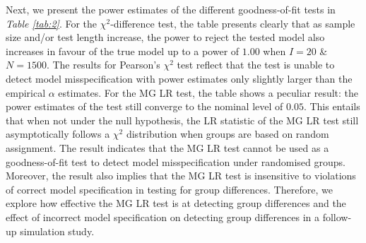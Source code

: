 \documentclass[Royal,sageapa,times,doublespace]{sagej}
\begin{document}
\indent Next, we present the power estimates of the different goodness-of-fit tests in \textit{Table \ref{tab:2}}. For the $\chi^2$-difference test, the table presents clearly that as sample size and/or test length increase, the power to reject the tested model also increases in favour of the true model up to a power of $1.00$ when $I = 20$ \& $N = 1500$. The results for Pearson's $\chi^2$ test reflect that the test is unable to detect model misspecification with power estimates only slightly larger than the empirical $\alpha$ estimates. For the MG LR test, the table shows a peculiar result: the power estimates of the test still converge to the nominal level of $0.05$. This entails that when not under the null hypothesis, the LR statistic of the MG LR test still asymptotically follows a $\chi^2$ distribution when groups are based on random assignment. The result indicates that the MG LR test cannot be used as a goodness-of-fit test to detect model misspecification under randomised groups. Moreover, the result also implies that the MG LR test is insensitive to violations of correct model specification in testing for group differences. Therefore, we explore how effective the MG LR test is at detecting group differences and the effect of incorrect model specification on detecting group differences in a follow-up simulation study. \\
\end{document}

